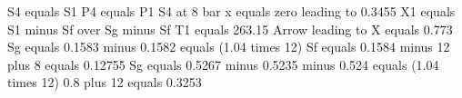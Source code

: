 S4 equals S1  
P4 equals P1  
S4 at 8 bar x equals zero leading to 0.3455  
X1 equals S1 minus Sf over Sg minus Sf  
T1 equals 263.15  
Arrow leading to X equals 0.773  
Sg equals 0.1583 minus 0.1582 equals (1.04 times 12)  
Sf equals 0.1584 minus 12 plus 8 equals 0.12755  
Sg equals 0.5267 minus 0.5235 minus 0.524 equals (1.04 times 12)  
0.8 plus 12 equals 0.3253